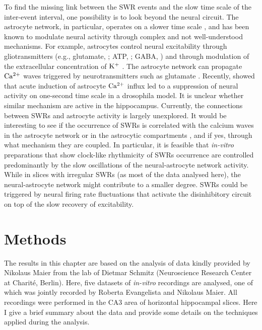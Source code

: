     To find the missing link between the SWR events and the slow time scale of
    the inter-event interval, one possibility is to look beyond the neural
    circuit. The astrocyte network, in particular, operates on a slower time
    scale \cite[$\sim 500 \,\rm ms$,][]{Sasaki2014}, and has been known to
    modulate neural activity through complex and not well-understood
    mechanisms. For example, astrocytes control neural excitability through
    gliotransmitters (e.g., glutamate, \citealp{Parpura1994}; ATP,
    \citealp{Newman2001}; GABA, \citealp{Liu2000}) and through modulation of
    the extracellular concentration of $\rm K^+$ \citep{Wang2012}. The
    astrocyte network can propagate $\rm Ca^{2+}$ waves triggered by
    neurotransmitters such as glutamate \citep[e.g.,][]{Cornell1990}.
    Recently, \cite{Zhang2017} showed that acute induction of astrocyte $\rm
    Ca^{2+}$ influx led to a suppression of neural activity on one-second time
    scale in a drosophila model. It is unclear whether similar mechanism are
    active in the hippocampus. Currently, the connections between SWRs and
    astrocyte activity is largely unexplored. It would be interesting to see if
    the occurrence of SWRs is correlated with the calcium waves in the
    astrocyte network or in the astrocytic compartments \citep{Oschmann2017},
    and if yes, through what mechanism they are coupled. In particular, it is
    feasible that \textit{in-vitro} preparations that show clock-like
    rhythmicity of SWRs occurrence are controlled predominantly by the slow
    oscillations of the neural-astrocyte network activity. While in slices with
    irregular SWRs (as most of the data analysed here), the neural-astrocyte
    network might contribute to a smaller degree.  SWRs could be triggered by
    neural firing rate fluctuations that activate the disinhibitory circuit on
    top of the slow recovery of excitability.



\section{Methods}
  The results in this chapter are based on the analysis of data kindly provided
  by Nikolaus Maier from the lab of Dietmar Schmitz (Neuroscience Research
  Center at Charit\'{e}, Berlin). Here, five datasets of \textit{in-vitro}
  recordings are analysed, one of which was jointly recorded by Roberta
  Evangelista and Nikolaus Maier. All recordings were performed in the CA3 area
  of horizontal hippocampal slices. Here I give a brief summary about the data
  and provide some details on the techniques applied during the analysis.


